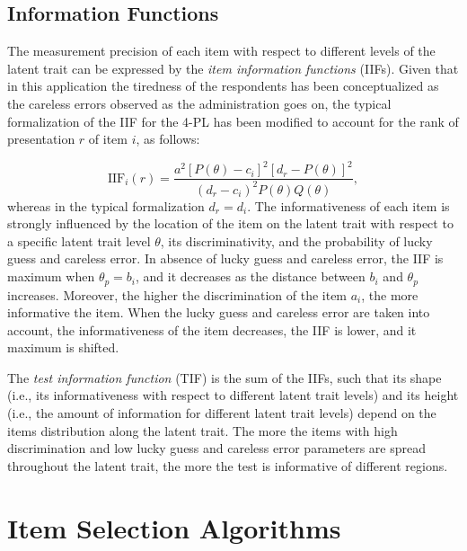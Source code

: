 \documentclass{svproc}
\begin{document}
\subsection{Information Functions}

The measurement precision of each item with respect to different levels of the latent trait can be expressed by the \emph{item information functions} (IIFs). 
\color{blue}
Given that in this application the tiredness of the respondents has been conceptualized as the careless errors observed as the administration goes on, the typical formalization of the IIF for the 4-PL \cite{magis:iif} has been modified to account for the rank of presentation $r$ of item $i$, as follows:
\normalcolor


\begin{equation}\label{eq:iif}
	\text{IIF}_{i}(r) = \dfrac{a^2[P(\theta)-c_i]^2[d_r - P(\theta)]^2}{(d_{r}-c_i)^2 P(\theta)Q(\theta)}, 
\end{equation}
whereas in the typical formalization $d_r = d_i$.
The informativeness of each item is strongly influenced by the location of the item on the latent trait with respect to a specific latent trait level $\theta$, its discriminativity, and the probability of lucky guess and careless error. In absence of lucky guess and careless error, the IIF is maximum when  $\theta_p = b_i$, and it decreases as the distance between $b_i$ and $\theta_p$ increases. Moreover, the higher the discrimination of the item $a_i$, the more informative the item. When the lucky guess and careless error are taken into account, the informativeness of the item decreases, the IIF is lower, and it maximum is shifted. 

The \emph{test information function} (TIF) is the sum of the IIFs, such that its shape (i.e., its informativeness with respect to different latent trait levels) and its height (i.e., the amount of information for different latent trait levels) depend on the items distribution along the latent trait. The more the items with high discrimination and low lucky guess and careless error parameters are spread throughout the latent trait, the more the test is informative of different regions. 


\section{Item Selection Algorithms}
\end{document}
